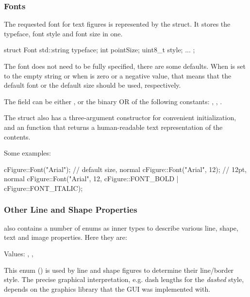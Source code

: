 \subsubsection{Fonts}
\label{sec:graphics:canvas-fonts}

The requested font for text figures is represented by the 
struct. It stores the typeface, font style and font size in one.

\begin{cpp}
struct Font {
    std::string typeface;
    int pointSize;
    uint8_t style;
    ...
};
\end{cpp}

The font does not need to be fully specified, there are some defaults. When
 is set to the empty string or when  is zero
or a negative value, that means that the default font or the default size
should be used, respectively.

The  field can be either , or the binary OR of
the following constants: , ,
.

The struct also has a three-argument constructor for convenient
initialization, and an  function that returns a human-readable
text representation of the contents.

Some examples:

\begin{cpp}
cFigure::Font("Arial");  // default size, normal
cFigure::Font("Arial", 12);  // 12pt, normal
cFigure::Font("Arial", 12, cFigure::FONT_BOLD | cFigure::FONT_ITALIC);
\end{cpp}


\subsubsection{Other Line and Shape Properties}
\label{sec:graphics:canvas-line-and-shape-properties}

 also contains a number of enums as inner types to describe
various line, shape, text and image properties. Here they are:


Values: , , 

This enum () is used by line and shape figures
to determine their line/border style. The precise graphical interpretation,
e.g. dash lengths for the \textit{dashed} style, depends on the graphics
library that the GUI was implemented with.

